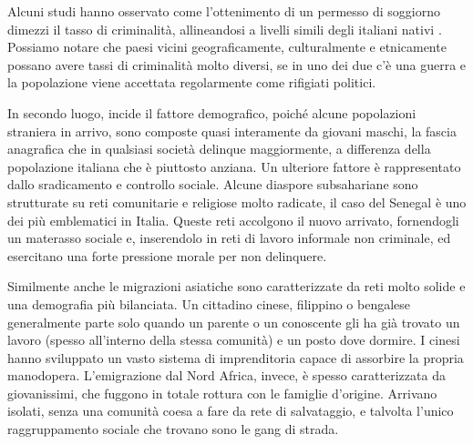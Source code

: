\documentclass[12pt]{book} %
\begin{document}
Alcuni studi  hanno osservato come l'ottenimento di un permesso di soggiorno dimezzi il tasso di criminalità, allineandosi a livelli simili degli italiani nativi    . Possiamo notare che paesi vicini geograficamente, culturalmente e etnicamente possano avere tassi di criminalità molto diversi, se in uno dei due c'è una guerra e la popolazione viene accettata regolarmente come rifigiati politici.

In secondo luogo, incide il fattore demografico, poiché alcune popolazioni straniera in arrivo, sono composte quasi interamente da giovani maschi, la fascia anagrafica che in qualsiasi società delinque maggiormente, a differenza della popolazione italiana che è piuttosto anziana.
Un ulteriore fattore è rappresentato dallo sradicamento e controllo sociale.
Alcune diaspore subsahariane sono strutturate su reti comunitarie e religiose molto radicate, il caso del Senegal è uno dei più emblematici in Italia. Queste reti accolgono il nuovo arrivato, fornendogli un materasso sociale e, inserendolo in reti di lavoro informale non criminale, ed esercitano una forte pressione morale per non delinquere. 

Similmente anche le migrazioni asiatiche sono caratterizzate da reti molto solide e una demografia più bilanciata. Un cittadino cinese, filippino o bengalese generalmente parte solo quando un parente o un conoscente gli ha già trovato un lavoro (spesso all'interno della stessa comunità) e un posto dove dormire.
I cinesi hanno sviluppato un vasto sistema di imprenditoria capace di assorbire la propria manodopera.
L'emigrazione dal Nord Africa, invece, è spesso caratterizzata da giovanissimi, che fuggono in totale rottura con le famiglie d'origine. Arrivano isolati, senza una comunità coesa a fare da rete di salvataggio, e talvolta l'unico raggruppamento sociale che trovano sono le gang di strada.
\end{document}
